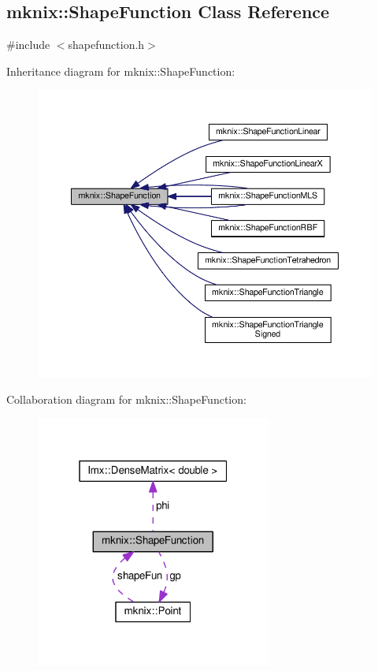 \hypertarget{classmknix_1_1_shape_function}{}\subsection{mknix\+:\+:Shape\+Function Class Reference}
\label{classmknix_1_1_shape_function}


{\ttfamily \#include $<$shapefunction.\+h$>$}



Inheritance diagram for mknix\+:\+:Shape\+Function\+:\nopagebreak
\begin{figure}[H]
\begin{center}
\leavevmode
\includegraphics[width=350pt]{d2/de3/classmknix_1_1_shape_function__inherit__graph}
\end{center}
\end{figure}


Collaboration diagram for mknix\+:\+:Shape\+Function\+:\nopagebreak
\begin{figure}[H]
\begin{center}
\leavevmode
\includegraphics[width=220pt]{d6/d56/classmknix_1_1_shape_function__coll__graph}
\end{center}
\end{figure}
